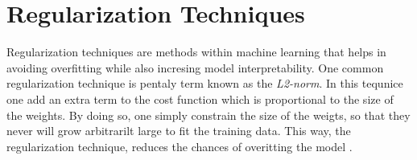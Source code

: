 \documentclass[a4paper, UKenglish, 11pt]{uiomaster}
\begin{document}
%
%
%
%
%
%
%



\section{Regularization Techniques}
Regularization techniques are methods within machine learning that helps in avoiding overfitting while also incresing model interpretability. One common regularization technique is pentaly term known as the \emph{L2-norm}. In this tequnice one add an extra term to the cost function which is proportional to the size of the weights. By doing so, one simply constrain the size of the weigts, so that they never will grow arbitrarilt large to fit the training data. This way, the regularization technique, reduces the chances of overitting the model \cite{Hjorth-Jensen2022}.
\end{document}
